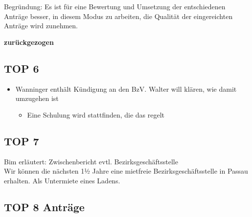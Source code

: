 \documentclass{protokoll}
\begin{document}
Begründung:
Es ist für eine Bewertung und Umsetzung der entschiedenen Anträge
besser, in diesem Modus zu arbeiten, die Qualität der eingereichten
Anträge wird zunehmen.

\textbf{zurückgezogen}


\subsection{TOP 6} 
\begin{itemize}
\item Wanninger enthält Kündigung an den BzV.  Walter will klären, wie damit umzugehen ist
  \begin{itemize}
  \item Eine Schulung wird stattfinden, die das regelt
  \end{itemize}
\end{itemize}

\subsection{TOP 7}

Bim erläutert: Zwischenbericht evtl. Bezirksgeschäftsstelle\\
Wir können die nächsten 1½ Jahre eine mietfreie Bezirksgeschäftsstelle in Passau erhalten.  
Als Untermiete eines Ladens.

\subsection{TOP 8 Anträge}
\end{document}
